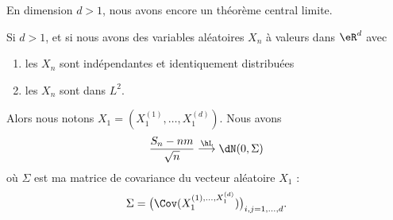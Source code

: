 En dimension \( d>1\), nous avons encore un théorème central limite.
\begin{theorem}
    Si \( d>1\), et si nous avons des variables aléatoires \( X_n\) à valeurs dans \( \eR^d\) avec
    \begin{enumerate}
        \item
            les \( X_n\) sont indépendantes et identiquement distribuées
        \item
            les \( X_n\) sont dans \( L^2\).
    \end{enumerate}
    Alors nous notons \( X_1=(X_1^{(1)},\ldots,X_1^{(d)})\). Nous avons
    \begin{equation}
        \frac{ S_n-nm }{ \sqrt{n} }\stackrel{\hL}{\longrightarrow}\dN(0,\Sigma)
    \end{equation}
    où \( \Sigma\) est ma matrice de covariance du vecteur aléatoire \( X_1\) :
    \begin{equation}
        \Sigma=\big( \Cov(X_1^{(1),\ldots,X_1^{(d)}}) \big)_{i,j=1,\ldots,d}.
    \end{equation}
\end{theorem}


